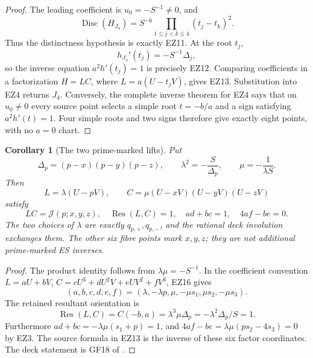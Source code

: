 \documentclass[11pt]{article}
\newtheorem{corollary}[theorem]{Corollary}
\theoremstyle{definition}\newtheorem{definition}[theorem]{Definition}
\theoremstyle{remark}\newtheorem{remark}[theorem]{Remark}
\newcommand{\Disc}{\operatorname{Disc}}
\newcommand{\Res}{\operatorname{Res}}
\begin{document}
\begin{proof}
The leading coefficient is \(u_0=-S^{-1}\ne0\), and
\begin{equation}
 \Disc(H_{J_4})=S^{-6}\prod_{1\le j<k\le4}(t_j-t_k)^2. \tag{EZ14}
\end{equation}
Thus the distinctness hypothesis is exactly EZ11.  At the root \(t_j\),
\[
 h_{J_4}'(t_j)=-S^{-1}\Delta_j,
\]
so the inverse equation \(a^2h'(t_j)=1\) is precisely EZ12.  Comparing
coefficients in a factorization
\(H=L C\), where \(L=a(U-t_jV)\), gives EZ13.  Substitution into EZ4
returns \(J_4\).  Conversely, the complete inverse theorem for EZ4 says
that on \(u_0\ne0\) every source point selects a simple root
\(t=-b/a\) and a sign satisfying \(a^2h'(t)=1\).  Four simple roots and
two signs therefore give exactly eight points, with no \(a=0\) chart.
\end{proof}

\begin{corollary}[The two prime-marked lifts]
Put
\begin{equation}
 \Delta_p=(p-x)(p-y)(p-z),\qquad
 \lambda^2=-\frac S{\Delta_p},\qquad
 \mu=-\frac1{\lambda S}.                               \tag{EZ15}
\end{equation}
Then
\begin{equation}
 L=\lambda(U-pV),\qquad
 C=\mu(U-xV)(U-yV)(U-zV)                               \tag{EZ16}
\end{equation}
satisfy
\begin{equation}
 LC=\mathcal J(p;x,y,z),\quad
 \Res(L,C)=1,\quad ad+bc=1,\quad 4af-be=0.              \tag{EZ17}
\end{equation}
The two choices of \(\lambda\) are exactly \(q_{p,+},q_{p,-}\), and
the rational deck involution exchanges them.  The other six fibre points mark
\(x,y,z\); they are not additional prime-marked ES inverses.
\end{corollary}

\begin{proof}
The product identity follows from \(\lambda\mu=-S^{-1}\).  In the
coefficient convention
\(L=aU+bV\), \(C=cU^3+dU^2V+eUV^2+fV^3\), EZ16 gives
\[
 (a,b,c,d,e,f)=(\lambda,-\lambda p,
 \mu,-\mu s_1,\mu s_2,-\mu s_3).
\]
The retained resultant orientation is
\[
 \Res(L,C)=C(-b,a)=\lambda^3\mu\Delta_p
           =-\lambda^2\Delta_p/S=1.
\]
Furthermore
\(ad+bc=-\lambda\mu(s_1+p)=1\), and
\(4af-be=\lambda\mu(ps_2-4s_3)=0\) by EZ3.  The source formula in
EZ13 is the inverse of these six factor coordinates.  The deck statement is
GF18 of \cite{SignedCover}.
\end{proof}
\end{document}
